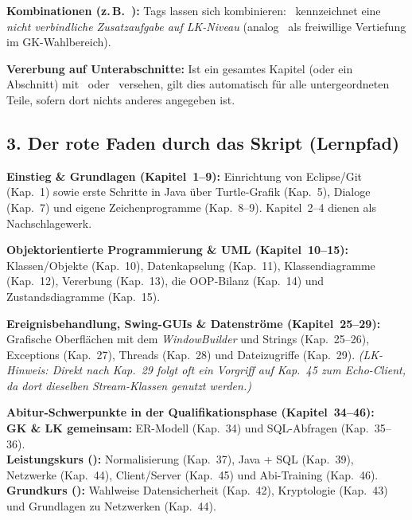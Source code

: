\begin{compactitem}
  \item \textbf{Kombinationen (z.\,B.\ \tagZusatz\tagLK):}
  Tags lassen sich kombinieren: \tagZusatz\tagLK\ kennzeichnet eine
  \emph{nicht verbindliche Zusatzaufgabe auf LK-Niveau} (analog \tagZusatz\tagGKWahl\
  als freiwillige Vertiefung im GK-Wahlbereich).
  \item \textbf{Vererbung auf Unterabschnitte:}
  Ist ein gesamtes Kapitel (oder ein Abschnitt) mit \tagZusatz\ oder \tagLK\
  versehen, gilt dies automatisch für alle untergeordneten Teile, sofern dort
  nichts anderes angegeben ist.
\end{compactitem}

\vspace{-4pt}
\subsection*{3. Der rote Faden durch das Skript (Lernpfad)}

\begin{compactenum}[1.]
  \item \textbf{Einstieg \& Grundlagen (Kapitel~1--9):}
  Einrichtung von Eclipse/Git (Kap.~1) sowie erste Schritte in Java über
  Turtle-Grafik (Kap.~5), Dialoge (Kap.~7) und eigene Zeichenprogramme
  (Kap.~8--9). Kapitel~2--4 dienen als Nachschlagewerk.
  \item \textbf{Objektorientierte Programmierung \& UML (Kapitel~10--15):}
  Klassen/Objekte (Kap.~10), Datenkapselung (Kap.~11), Klassendiagramme
  (Kap.~12), Vererbung (Kap.~13), die OOP-Bilanz (Kap.~14) und
  Zustandsdiagramme (Kap.~15).
  \item \textbf{Ereignisbehandlung, Swing-GUIs \& Datenströme (Kapitel~25--29):}
  Grafische Oberflächen mit dem \emph{WindowBuilder} und Strings (Kap.~25--26),
  Exceptions (Kap.~27), Threads (Kap.~28) und Dateizugriffe (Kap.~29).
  \emph{(LK-Hinweis: Direkt nach Kap.~29 folgt oft ein Vorgriff auf Kap.~45
  zum Echo-Client, da dort dieselben Stream-Klassen genutzt werden.)}
  \item \textbf{Abitur-Schwerpunkte in der Qualifikationsphase (Kapitel~34--46):}\\
  \textbf{GK \& LK gemeinsam:} ER-Modell (Kap.~34) und SQL-Abfragen (Kap.~35--36).\\
  \textbf{Leistungskurs (\tagLK):} Normalisierung (Kap.~37), Java + SQL
  (Kap.~39), Netzwerke (Kap.~44), Client/Server (Kap.~45) und Abi-Training
  (Kap.~46).\\
  \textbf{Grundkurs (\tagGKWahl):} Wahlweise Datensicherheit (Kap.~42),
  Kryptologie (Kap.~43) und Grundlagen zu Netzwerken (Kap.~44).
\end{compactenum}

\clearpage
